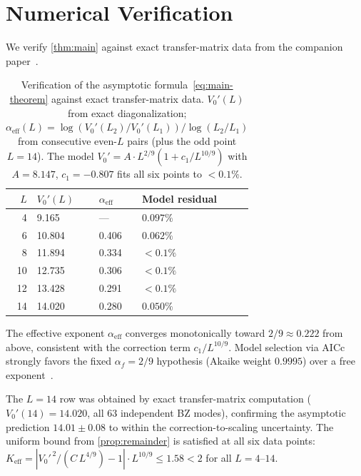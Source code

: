 \documentclass[11pt]{article}
\theoremstyle{definition}
\theoremstyle{remark}
\begin{document}
\section{Numerical Verification}
\label{sec:numerics}

We verify \cref{thm:main} against exact transfer-matrix data from the
companion paper~\cite{PredLetter}.

\begin{table}[h]
\caption{Verification of the asymptotic formula~\eqref{eq:main-theorem}
against exact transfer-matrix data. $V_0'(L)$ from exact diagonalization;
$\alpha_\mathrm{eff}(L) = \log(V_0'(L_2)/V_0'(L_1)) / \log(L_2/L_1)$
from consecutive even-$L$ pairs (plus the odd point $L = 14$).
The model $V_0' = A \cdot L^{2/9}(1 + c_1/L^{10/9})$ with
$A = 8.147$, $c_1 = -0.807$ fits all six points to $< 0.1\%$.}
\label{tab:verification}
\begin{center}
\begin{tabular}{rlll}
\toprule
$L$ & $V_0'(L)$ & $\alpha_\mathrm{eff}$ & Model residual \\
\midrule
4  & 9.165 &  ---   & $0.097\%$ \\
6  & 10.804 & 0.406 & $0.062\%$ \\
8  & 11.894 & 0.334 & $< 0.1\%$ \\
10 & 12.735 & 0.306 & $< 0.1\%$ \\
12 & 13.428 & 0.291 & $< 0.1\%$ \\
14 & 14.020 & 0.280 & $0.050\%$ \\
\bottomrule
\end{tabular}
\end{center}
\end{table}

The effective exponent $\alpha_\mathrm{eff}$ converges monotonically
toward $2/9 \approx 0.222$ from above, consistent with the correction
term $c_1/L^{10/9}$.
Model selection via AICc strongly favors the fixed
$\alpha_f = 2/9$ hypothesis (Akaike weight $0.9995$) over a free
exponent~\cite{PredLetter}.

The $L = 14$ row was obtained by exact transfer-matrix computation
($V_0'(14) = 14.020$, all $63$ independent BZ modes), confirming the
asymptotic prediction $14.01 \pm 0.08$ to within the
correction-to-scaling uncertainty.
The uniform bound from \cref{prop:remainder} is satisfied at all six
data points: $K_{\mathrm{eff}} = |V_0'^{\,2}/(C\,L^{4/9}) - 1|
\cdot L^{10/9} \leq 1.58 < 2$ for all $L = 4$--$14$.
\end{document}
